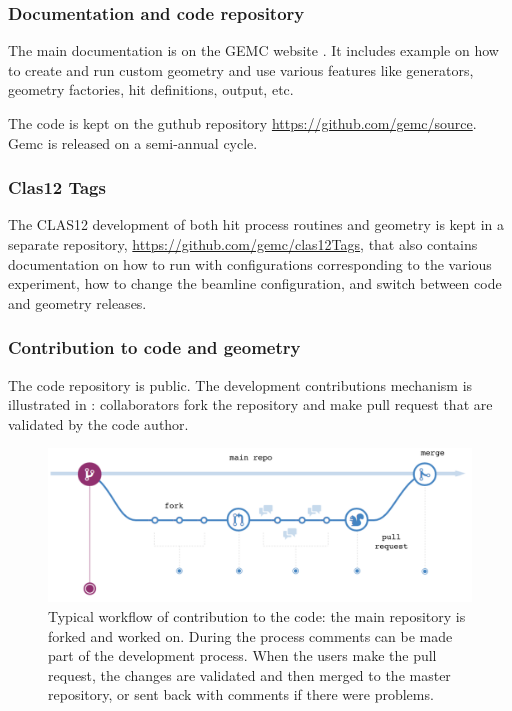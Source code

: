 \subsubsection{Documentation and code repository}

The main documentation is on the GEMC website \cite{gemc}. It includes example on how to create and run custom geometry
and use various features like generators, geometry factories, hit definitions, output, etc.

The code is kept on the guthub repository \url{https://github.com/gemc/source}. Gemc is released on a semi-annual cycle.

\subsubsection{Clas12 Tags}
The CLAS12 development of both hit process routines and geometry is kept in a separate repository, \url{https://github.com/gemc/clas12Tags},
that also contains documentation on how to run with configurations corresponding to the various experiment, how to change the
beamline configuration, and switch between code and geometry releases.


\subsubsection{Contribution to code and geometry}

The code repository is public. The development contributions mechanism is illustrated in : collaborators fork the repository
and make pull request that are validated by the code author.

\begin{figure}
	\centering
	\includegraphics[width=0.95\columnwidth,keepaspectratio]{img/github.png}
	\caption{Typical workflow of contribution to the code: the main repository is forked and worked on. During the process comments
             can be made part of the development process. When the users make the pull request, the changes are validated and then merged
             to the master repository, or sent back with comments if there were problems.}
	\label{fig:github}
\end{figure}




